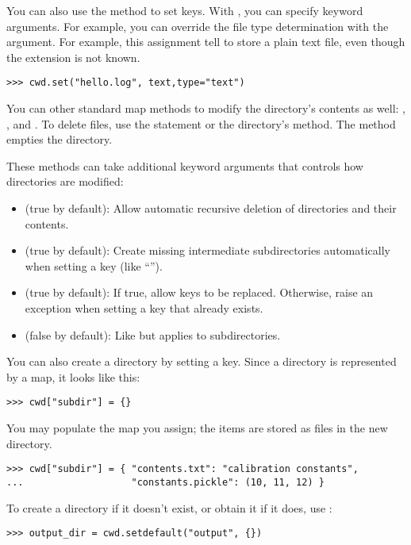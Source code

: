 You can also use the  method to set keys.  With
, you can specify keyword arguments.  For example, you can
override the file type determination with the  argument.
For example, this assignment tell \pyhep to store a plain text file,
even though the extension  is not known.
\begin{verbatim}
>>> cwd.set("hello.log", text,type="text")
\end{verbatim}

You can other standard map methods to modify the directory's contents as
well: , , and .  To
delete files, use the  statement or the directory's
 method.  The  method empties the
directory.

These methods can take additional keyword arguments that controls how
directories are modified:
\begin{itemize}
 \item {} (true by default): Allow automatic recursive
 deletion of directories and their contents.

 \item {} (true by default): Create missing intermediate
 subdirectories automatically when setting a key (like ``''). 

 \item {} (true by default): If true, allow keys to be
 replaced.  Otherwise, raise an exception when setting a key that
 already exists.

 \item {} (false by default): Like  but
 applies to subdirectories.
\end{itemize}

You can also create a directory by setting a key.  Since a directory is
represented by a map, it looks like this:
\begin{verbatim}
>>> cwd["subdir"] = {}
\end{verbatim}
You may populate the map you assign; the items are stored as files in
the new directory.
\begin{verbatim}
>>> cwd["subdir"] = { "contents.txt": "calibration constants", 
...                   "constants.pickle": (10, 11, 12) }
\end{verbatim}
To create a directory if it doesn't exist, or obtain it if it does, use
:
\begin{verbatim}
>>> output_dir = cwd.setdefault("output", {})
\end{verbatim}

